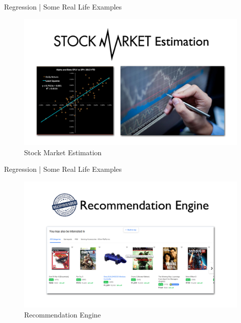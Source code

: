 \documentclass[10pt]{beamer}
\begin{document}
	\begin{frame}{Regression | Some Real Life Examples}
		\begin{figure}
			\begin{center}
				\vspace{-5mm}
				\includegraphics[scale=0.2]{images/sto}
				\caption{Stock Market Estimation}
			\end{center}
		\end{figure}
	\end{frame}
	
	\begin{frame}{Regression | Some Real Life Examples}
		\begin{figure}
			\begin{center}
				\vspace{-5mm}
				\includegraphics[scale=0.2]{images/reco}
				\caption{Recommendation Engine}
			\end{center}
		\end{figure}
	\end{frame}
	
\end{document}

